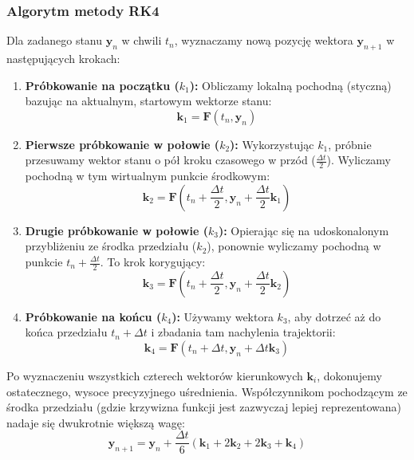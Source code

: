 \subsubsection{Algorytm metody RK4}
Dla zadanego stanu $\mathbf{y}_n$ w chwili $t_n$, wyznaczamy nową pozycję wektora $\mathbf{y}_{n+1}$ w następujących krokach:

\begin{enumerate}
    \item \textbf{Próbkowanie na początku ($k_1$):} Obliczamy lokalną pochodną (styczną) bazując na aktualnym, startowym wektorze stanu:
    \begin{equation}
        \mathbf{k}_1 = \mathbf{F}(t_n, \mathbf{y}_n)
    \end{equation}
    
    \item \textbf{Pierwsze próbkowanie w połowie ($k_2$):} Wykorzystując $k_1$, próbnie przesuwamy wektor stanu o pół kroku czasowego w przód ($\frac{\Delta t}{2}$). Wyliczamy pochodną w tym wirtualnym punkcie środkowym:
    \begin{equation}
        \mathbf{k}_2 = \mathbf{F}\left(t_n + \frac{\Delta t}{2}, \mathbf{y}_n + \frac{\Delta t}{2}\mathbf{k}_1\right)
    \end{equation}
    
    \item \textbf{Drugie próbkowanie w połowie ($k_3$):} Opierając się na udoskonalonym przybliżeniu ze środka przedziału ($k_2$), ponownie wyliczamy pochodną w punkcie $t_n + \frac{\Delta t}{2}$. To krok korygujący:
    \begin{equation}
        \mathbf{k}_3 = \mathbf{F}\left(t_n + \frac{\Delta t}{2}, \mathbf{y}_n + \frac{\Delta t}{2}\mathbf{k}_2\right)
    \end{equation}
    
    \item \textbf{Próbkowanie na końcu ($k_4$):} Używamy wektora $k_3$, aby dotrzeć aż do końca przedziału $t_n + \Delta t$ i zbadania tam nachylenia trajektorii:
    \begin{equation}
        \mathbf{k}_4 = \mathbf{F}(t_n + \Delta t, \mathbf{y}_n + \Delta t \mathbf{k}_3)
    \end{equation}
\end{enumerate}

Po wyznaczeniu wszystkich czterech wektorów kierunkowych $\mathbf{k}_i$, dokonujemy ostatecznego, wysoce precyzyjnego uśrednienia. Współczynnikom pochodzącym ze środka przedziału (gdzie krzywizna funkcji jest zazwyczaj lepiej reprezentowana) nadaje się dwukrotnie większą wagę:
\begin{equation}
    \mathbf{y}_{n+1} = \mathbf{y}_n + \frac{\Delta t}{6} \left( \mathbf{k}_1 + 2\mathbf{k}_2 + 2\mathbf{k}_3 + \mathbf{k}_4 \right)
\end{equation}

